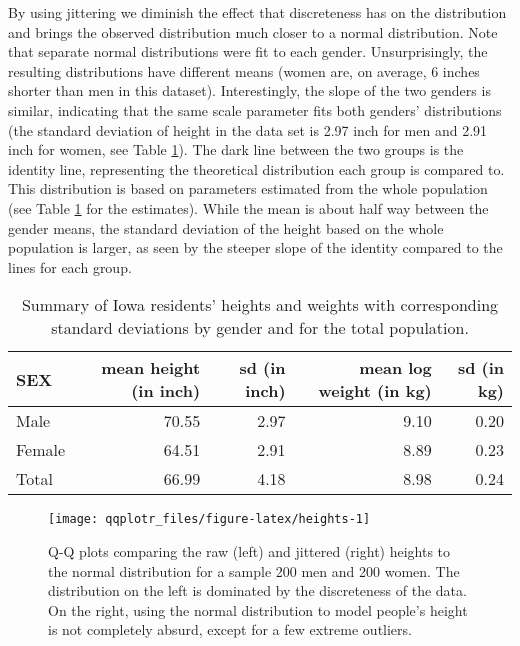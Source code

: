 By using jittering we diminish the effect that discreteness has on the
distribution and brings the observed distribution much closer to a
normal distribution. Note that separate normal distributions were fit to
each gender. Unsurprisingly, the resulting distributions have different
means (women are, on average, 6 inches shorter than men in this
dataset). Interestingly, the slope of the two genders is similar,
indicating that the same scale parameter fits both genders'
distributions (the standard deviation of height in the data set is 2.97
inch for men and 2.91 inch for women, see Table \ref{tab:heights}). The
dark line between the two groups is the identity line, representing the
theoretical distribution each group is compared to. This distribution is
based on parameters estimated from the whole population (see Table
\ref{tab:heights} for the estimates). While the mean is about half way
between the gender means, the standard deviation of the height based on
the whole population is larger, as seen by the steeper slope of the
identity compared to the lines for each group.

\begin{table}

\caption{\label{tab:heights-table}Summary of Iowa residents' heights and weights with corresponding standard deviations by gender and for the total population.\label{tab:heights}}
\centering
\begin{tabular}[t]{lrrrr}
\toprule
SEX & mean height (in inch) & sd (in inch) & mean log weight (in kg) & sd (in kg)\\
\midrule
Male & 70.55 & 2.97 & 9.10 & 0.20\\
Female & 64.51 & 2.91 & 8.89 & 0.23\\
Total & 66.99 & 4.18 & 8.98 & 0.24\\
\bottomrule
\end{tabular}
\end{table}

\begin{Schunk}
\begin{figure}

{\centering \texttt{[image: qqplotr\_files/figure-latex/heights-1]} 

}

\caption[Q-Q plots comparing the raw (left) and jittered (right) heights to the normal distribution for a sample 200 men and 200 women]{Q-Q plots comparing the raw (left) and jittered (right) heights to the normal distribution for a sample 200 men and 200 women. The distribution on the left is dominated by the discreteness of the data. On the right, using the normal distribution to model people's height is not completely absurd, except for a few extreme outliers.}\label{fig:heights}
\end{figure}
\end{Schunk}

